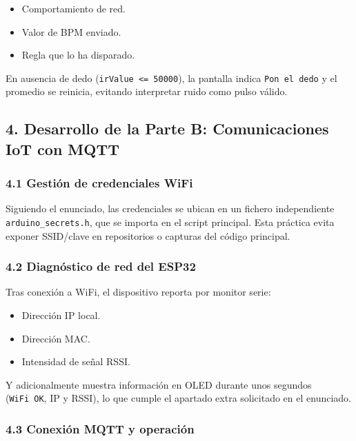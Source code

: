 \documentclass[11pt]{article}
\providecommand{\tightlist}{%
      \setlength{\itemsep}{0pt}\setlength{\parskip}{0pt}}
\begin{document}
\begin{itemize}
\tightlist
\item
  Comportamiento de red.
\item
  Valor de BPM enviado.
\item
  Regla que lo ha disparado.
\end{itemize}

En ausencia de dedo (\texttt{irValue\ \textless{}=\ 50000}), la pantalla
indica \texttt{Pon\ el\ dedo} y el promedio se reinicia, evitando
interpretar ruido como pulso válido.

    \subsection{4. Desarrollo de la Parte B: Comunicaciones IoT con
MQTT}\label{desarrollo-de-la-parte-b-comunicaciones-iot-con-mqtt}

\subsubsection{4.1 Gestión de credenciales
WiFi}\label{gestiuxf3n-de-credenciales-wifi}

Siguiendo el enunciado, las credenciales se ubican en un fichero
independiente \texttt{arduino\_secrets.h}, que se importa en el script
principal. Esta práctica evita exponer SSID/clave en repositorios o
capturas del código principal.

\subsubsection{4.2 Diagnóstico de red del
ESP32}\label{diagnuxf3stico-de-red-del-esp32}

Tras conexión a WiFi, el dispositivo reporta por monitor serie:

\begin{itemize}
\tightlist
\item
  Dirección IP local.
\item
  Dirección MAC.
\item
  Intensidad de señal RSSI.
\end{itemize}

Y adicionalmente muestra información en OLED durante unos segundos
(\texttt{WiFi\ OK}, IP y RSSI), lo que cumple el apartado extra
solicitado en el enunciado.

\subsubsection{4.3 Conexión MQTT y
operación}\label{conexiuxf3n-mqtt-y-operaciuxf3n}
\end{document}
